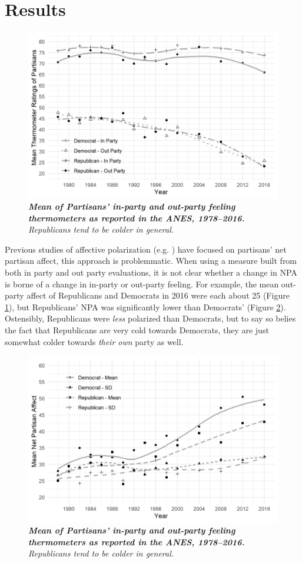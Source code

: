 \documentclass[12pt]{article}
\begin{document}
\section{Results}

\begin{figure}[H]
\center\includegraphics[width=5in]{cdf-mean.png}
\caption{\label{fig:cdf-mean} \textit{\textbf{Mean of Partisans' in-party and out-party feeling thermometers as reported in the ANES, 1978--2016.} Republicans tend to be colder in general.}}
\end{figure}

Previous studies of affective polarization (e.g. \citet{iyengar2012affect}) have  focused on partisans' net partisan affect, this approach is problemmatic. When using a measure built from both in party and out party evaluations, it is not clear whether a change in NPA is borne of a change in in-party or out-party feeling. For example, the mean out-party affect of Republicans and Democrats in 2016 were each about 25 (Figure \ref{fig:cdf-mean}), but Republicans' NPA was significantly lower than Democrats' (Figure \ref{fig:cdf-npa}). Ostensibly, Republicans were \textit{less} polarized than Democrats, but to say so belies the fact that Republicans are very cold towards Democrats, they are just somewhat colder towards \textit{their own} party as well.
\begin{figure}[H]
\center\includegraphics[width=5in]{cdf-npa.png}
\caption{\label{fig:cdf-npa} \textit{\textbf{Mean of Partisans' in-party and out-party feeling thermometers as reported in the ANES, 1978--2016.} Republicans tend to be colder in general.}}
\end{figure}
\end{document}
